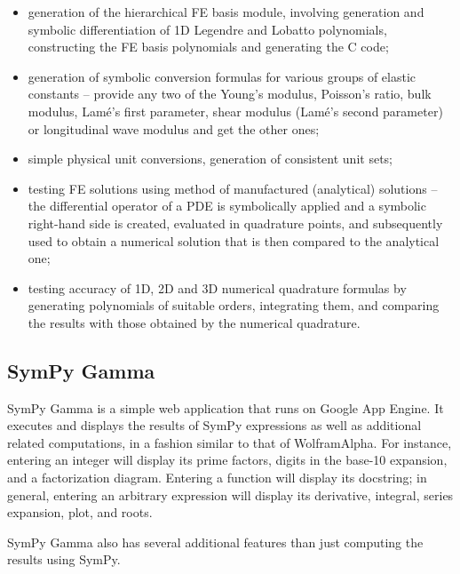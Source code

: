 \begin{itemize}
\item generation of the hierarchical FE basis module, involving generation and
  symbolic differentiation of 1D Legendre and Lobatto polynomials, constructing
  the FE basis polynomials and generating the C code;
\item generation of symbolic conversion formulas for various groups of elastic
  constants -- provide any two of the Young's modulus, Poisson's ratio, bulk
  modulus, Lamé's first parameter, shear modulus (Lamé's second parameter) or
  longitudinal wave modulus and get the other ones;
\item simple physical unit conversions, generation of consistent unit sets;
\item testing FE solutions using method of manufactured (analytical) solutions
  -- the differential operator of a PDE is symbolically applied and a symbolic
  right-hand side is created, evaluated in quadrature points, and subsequently
  used to obtain a numerical solution that is then compared to the analytical
  one;
\item testing accuracy of 1D, 2D and 3D numerical quadrature formulas by
  generating polynomials of suitable orders, integrating them, and comparing
  the results with those obtained by the numerical quadrature.
\end{itemize}

\subsection{SymPy Gamma}\label{sympy-gamma}

SymPy Gamma is a simple web application that runs on Google App Engine.
It executes and displays the results of SymPy expressions as well as
additional related computations, in a fashion similar to that of
Wolfram\textbar{}Alpha. For instance, entering an integer will display
its prime factors, digits in the base-10 expansion, and a factorization
diagram. Entering a function will display its docstring; in general,
entering an arbitrary expression will display its derivative, integral,
series expansion, plot, and roots.

SymPy Gamma also has several additional features than just computing the
results using SymPy.

